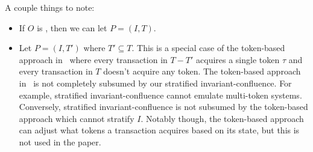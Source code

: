 A couple things to note:
\begin{itemize}
  \item
    If $O$ is \sTIconfluent{}, then we can let $P = (I, T)$.

  \item
    Let $P = (I, T')$ where $T' \subseteq T$. This is a special case of the
    token-based approach in~\cite{gotsman2016cause} where every transaction in
    $T - T'$ acquires a single token $\tau$ and every transaction in $T$
    doesn't acquire any token. The token-based approach
    in~\cite{gotsman2016cause} is not completely subsumed by our stratified
    invariant-confluence. For example, stratified invariant-confluence cannot
    emulate multi-token systems. Conversely, stratified invariant-confluence is
    not subsumed by the token-based approach which cannot stratify $I$. Notably
    though, the token-based approach can adjust what tokens a transaction
    acquires based on its state, but this is not used in the paper.
\end{itemize}

